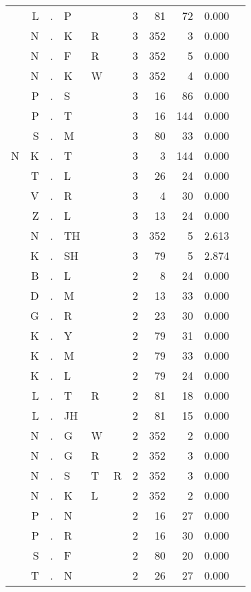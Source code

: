 \begin{longtable}{r@{ } r@{ } c@{ } l@{ } l@{ } l@{ } r r r r l }
  & L & . & P &   &   & 3 & 81 & 72 & 0.000 &  \\
  & N & . & K & R &   & 3 & 352 & 3 & 0.000 &  \\
  & N & . & F & R &   & 3 & 352 & 5 & 0.000 &  \\
  & N & . & K & W &   & 3 & 352 & 4 & 0.000 &  \\
  & P & . & S &   &   & 3 & 16 & 86 & 0.000 &  \\
  & P & . & T &   &   & 3 & 16 & 144 & 0.000 &  \\
  & S & . & M &   &   & 3 & 80 & 33 & 0.000 &  \\
N & K & . & T &   &   & 3 & 3 & 144 & 0.000 &  \\
  & T & . & L &   &   & 3 & 26 & 24 & 0.000 &  \\
  & V & . & R &   &   & 3 & 4 & 30 & 0.000 &  \\
  & Z & . & L &   &   & 3 & 13 & 24 & 0.000 &  \\
  & N & . & TH &   &   & 3 & 352 & 5 & 2.613 &  \\
  & K & . & SH &   &   & 3 & 79 & 5 & 2.874 &  \\
  & B & . & L &   &   & 2 & 8 & 24 & 0.000 &  \\
  & D & . & M &   &   & 2 & 13 & 33 & 0.000 &  \\
  & G & . & R &   &   & 2 & 23 & 30 & 0.000 &  \\
  & K & . & Y &   &   & 2 & 79 & 31 & 0.000 &  \\
  & K & . & M &   &   & 2 & 79 & 33 & 0.000 &  \\
  & K & . & L &   &   & 2 & 79 & 24 & 0.000 &  \\
  & L & . & T & R &   & 2 & 81 & 18 & 0.000 &  \\
  & L & . & JH &   &   & 2 & 81 & 15 & 0.000 &  \\
  & N & . & G & W &   & 2 & 352 & 2 & 0.000 &  \\
  & N & . & G & R &   & 2 & 352 & 3 & 0.000 &  \\
  & N & . & S & T & R & 2 & 352 & 3 & 0.000 &  \\
  & N & . & K & L &   & 2 & 352 & 2 & 0.000 &  \\
  & P & . & N &   &   & 2 & 16 & 27 & 0.000 &  \\
  & P & . & R &   &   & 2 & 16 & 30 & 0.000 &  \\
  & S & . & F &   &   & 2 & 80 & 20 & 0.000 &  \\
  & T & . & N &   &   & 2 & 26 & 27 & 0.000 &  \\

\end{longtable}
